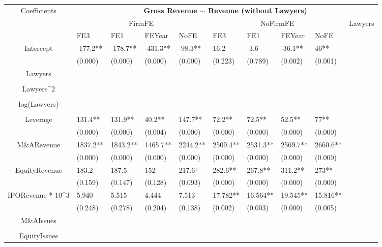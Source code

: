 \documentclass{article}
\begin{document}
\begin{table}[H]
\centering
\begin{tabular}{|clllllllll|}
\hline
\multirow{3}{*}{Coefficients} & \multicolumn{9}{c|}{\textbf{Gross Revenue $\sim$ Revenue (without Lawyers)}} \\
\cline{2-10}
& \multicolumn{4}{c}{FirmFE} & \multicolumn{4}{c}{NoFirmFE} & \multirow{2}{*}{Lawyers} \\
\cline{2-9}
& FE3 & FE1 & FEYear & NoFE & FE3 & FE1 & FEYear & NoFE &  \\
\hline
 
Intercept & -177.2** & -178.7** & -431.3** & -98.3** & 16.2 & -3.6 & -36.1** & 46** & \\ 
   & (0.000) & (0.000) & (0.000) & (0.000) & (0.223) & (0.789) & (0.002) & (0.001) & \\ 
  Lawyers &  &  &  &  &  &  &  &  & \\ 
   &  &  &  &  &  &  &  &  & \\ 
  Lawyers^2 &  &  &  &  &  &  &  &  & \\ 
   &  &  &  &  &  &  &  &  & \\ 
  log(Lawyers) &  &  &  &  &  &  &  &  & \\ 
   &  &  &  &  &  &  &  &  & \\ 
  Leverage & 131.4** & 131.9** & 40.2** & 147.7** & 72.2** & 72.5** & 52.5** & 77** & \\ 
   & (0.000) & (0.000) & (0.004) & (0.000) & (0.000) & (0.000) & (0.000) & (0.000) & \\ 
  M\&ARevenue & 1837.2** & 1843.2** & 1465.7** & 2244.2** & 2509.4** & 2531.3** & 2569.7** & 2660.6** & \\ 
   & (0.000) & (0.000) & (0.000) & (0.000) & (0.000) & (0.000) & (0.000) & (0.000) & \\ 
  EquityRevenue & 183.2 & 187.5 & 152 & 217.6$^{+}$ & 282.6** & 267.8** & 311.2** & 273** & \\ 
   & (0.159) & (0.147) & (0.128) & (0.093) & (0.000) & (0.000) & (0.000) & (0.000) & \\ 
  IPORevenue * 10^3 & 5.940 & 5.515 & 4.444 & 7.513 & 17.782** & 16.564** & 19.545** & 15.816** & \\ 
   & (0.248) & (0.278) & (0.204) & (0.138) & (0.002) & (0.003) & (0.000) & (0.005) & \\ 
  M\&AIssues &  &  &  &  &  &  &  &  & \\ 
   &  &  &  &  &  &  &  &  & \\ 
  EquityIssues &  &  &  &  &  &  &  &  & \\ 

\end{tabular}
\end{table}
\end{document}
